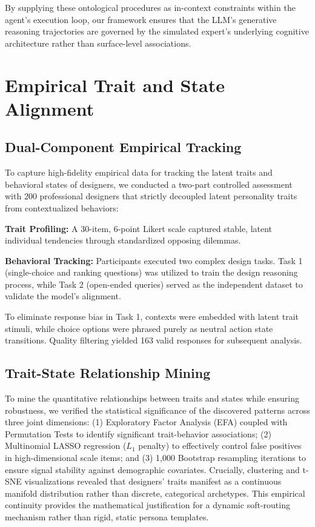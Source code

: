 \documentclass[11pt]{article}
\begin{document}
By supplying these ontological procedures as in-context constraints within the agent's execution loop, our framework ensures that the LLM's generative reasoning trajectories are  governed by the simulated expert's underlying cognitive architecture rather than surface-level associations.

\section{Empirical Trait and State Alignment}
\subsection{Dual-Component Empirical Tracking}
To capture high-fidelity empirical data for tracking the latent traits and behavioral states of designers, we conducted a two-part controlled assessment with 200 professional designers that strictly decoupled latent personality traits from contextualized behaviors:

\textbf{Trait Profiling:} A 30-item, 6-point Likert scale captured stable, latent individual tendencies through standardized opposing dilemmas.

\textbf{Behavioral Tracking:} Participants executed two complex design tasks. Task 1 (single-choice and ranking questions) was utilized to train the design reasoning process, while Task 2 (open-ended queries) served as the independent dataset to validate the model's alignment.

To eliminate response bias in Task 1, contexts were embedded with latent trait stimuli, while choice options were phrased purely as neutral action state transitions. Quality filtering yielded 163 valid responses for subsequent analysis.

\subsection{Trait-State Relationship Mining}
To mine the quantitative relationships between traits and states while ensuring robustness, we verified the statistical significance of the discovered patterns across three joint dimensions: (1) Exploratory Factor Analysis (EFA) coupled with Permutation Tests to identify significant trait-behavior associations; (2) Multinomial LASSO regression ($L_1$ penalty) to effectively control false positives in high-dimensional scale items; and (3) 1,000 Bootstrap resampling iterations to ensure signal stability against demographic covariates. Crucially, clustering and t-SNE visualizations revealed that designers' traits manifest as a continuous manifold distribution rather than discrete, categorical archetypes. This empirical continuity provides the mathematical justification for a dynamic soft-routing mechanism rather than rigid, static persona templates.
\end{document}
